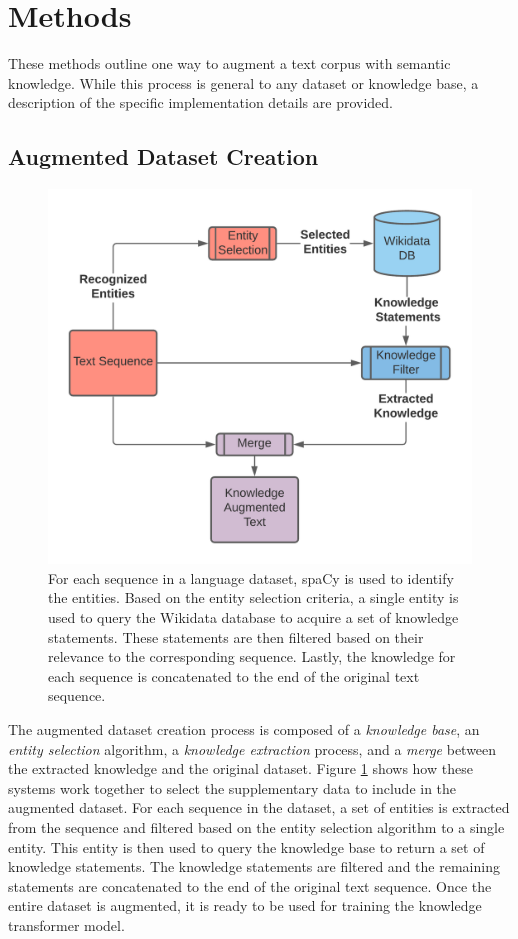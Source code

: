 \documentclass[phd,electronic,oneside,twosidetoc,letterpaper,chaptercenter,parttop,lof]{byumsphd}
\begin{document}
\section{Methods}

These methods outline one way to augment a text corpus with semantic knowledge.
While this process is general to any dataset or knowledge base, a description of the specific implementation details are provided.
    
\subsection{Augmented Dataset Creation}
    
\begin{figure}
\includegraphics[width=0.5\columnwidth]{images/ssm/augmented_dataset_creation.png}
\centering
\caption[Augmented dataset creation]{
    For each sequence in a language dataset, spaCy is used to identify the entities.
    Based on the entity selection criteria, a single entity is used to query the Wikidata database to acquire a set of knowledge statements.
    These statements are then filtered based on their relevance to the corresponding sequence.
    Lastly, the knowledge for each sequence is concatenated to the end of the original text sequence. 
}
\label{fig:augmented_dataset_creation}
\end{figure}

The augmented dataset creation process is composed of a \emph{knowledge base}, an \emph{entity selection} algorithm, a \emph{knowledge extraction} process, and a \emph{merge} between the extracted knowledge and the original dataset.
Figure \ref{fig:augmented_dataset_creation} shows how these systems work together to select the supplementary data to include in the augmented dataset. 
For each sequence in the dataset, a set of entities is extracted from the sequence and filtered based on the entity selection algorithm to a single entity.
This entity is then used to query the knowledge base to return a set of knowledge statements.
The knowledge statements are filtered and the remaining statements are concatenated to the end of the original text sequence.
Once the entire dataset is augmented, it is ready to be used for training the knowledge transformer model.
\end{document}
